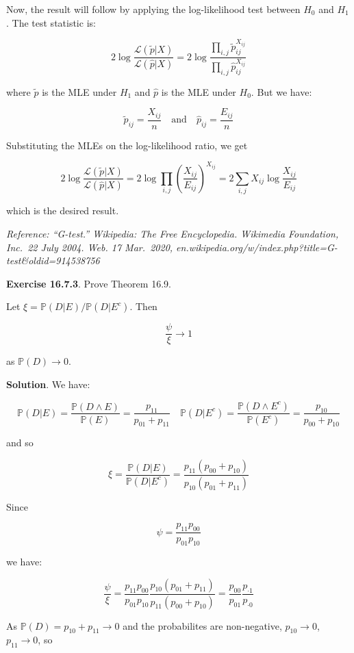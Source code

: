 Now, the result will follow by applying the log-likelihood test between
\(H_{0}\) and \(H_{1}\). The test statistic is:

\[ 2 \log \frac{\mathcal{L}(\tilde{p} | X)}{\mathcal{L}(\hat{p} | X)} 
= 2 \log \frac{\prod_{i, j} \tilde{p}_{ij}^{X_{ij}}}{\prod_{i, j} \hat{p}_{ij}^{X_{ij}}}\]

where \(\tilde{p}\) is the MLE under \(H_{1}\) and \(\hat{p}\) is the MLE
under \(H_{0}\). But we have:

\[
\tilde{p}_{ij} = \frac{X_{ij}}{n}
\quad \text{and} \quad
\hat{p}_{ij} = \frac{E_{ij}}{n}
\]

Substituting the MLEs on the log-likelihood ratio, we get

\[ 2 \log \frac{\mathcal{L}(\tilde{p} | X)}{\mathcal{L}(\hat{p} | X)} 
= 2 \log \prod_{i, j} \left( \frac{X_{ij}}{E_{ij}} \right)^{X_{ij}}
= 2 \sum_{i, j} X_{ij} \log \frac{X_{ij}}{E_{ij}}
\]

which is the desired result.

\emph{Reference: ``G-test.'' Wikipedia: The Free Encyclopedia. Wikimedia
Foundation, Inc.~22 July 2004. Web. 17 Mar.~2020,
en.wikipedia.org/w/index.php?title=G-test\&oldid=914538756}

\textbf{Exercise 16.7.3}. Prove Theorem 16.9.

Let \(\xi = \mathbb{P}(D | E) / \mathbb{P}(D | E^{c})\). Then

\[ \frac{\psi}{\xi} \rightarrow 1\]

as \(\mathbb{P}(D) \rightarrow 0\).

\textbf{Solution}. We have:

\[ \mathbb{P}(D | E) = \frac{\mathbb{P}(D \land E)}{\mathbb{P}(E)} = \frac{p_{11}}{p_{01} + p_{11}}
\quad
\mathbb{P}(D | E^{c}) = \frac{\mathbb{P}(D \land E^{c})}{\mathbb{P}(E^{c})} = \frac{p_{10}}{p_{00} + p_{10}}
\]

and so

\[
\xi = \frac{\mathbb{P}(D | E)}{\mathbb{P}(D | E^{c})}
= \frac{p_{11} (p_{00} + p_{10})}{p_{10} (p_{01} + p_{11})}
\]

Since

\[ \psi = \frac{p_{11}p_{00}}{p_{01}p_{10}}\]

we have:

\[ \frac{\psi}{\xi} = \frac{p_{11}p_{00}}{p_{01}p_{10}} \frac{p_{10} (p_{01} + p_{11})}{p_{11} (p_{00} + p_{10})} 
= \frac{p_{00}}{p_{01}} \frac{p_{\text{·}1}}{p_{\text{·}0}}
\]

As \(\mathbb{P}(D) = p_{10} + p_{11} \rightarrow 0\) and the
probabilites are non-negative, \(p_{10} \rightarrow 0\),
\(p_{11} \rightarrow 0\), so

